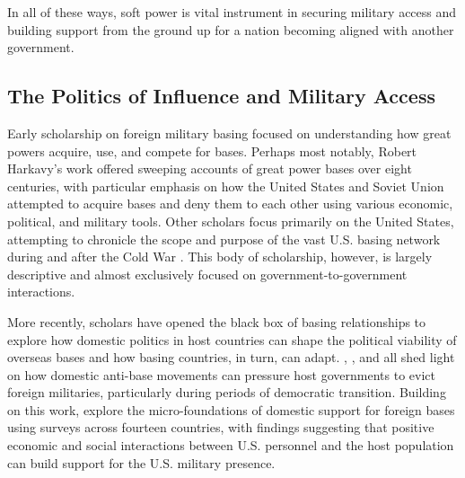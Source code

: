 In all of these ways, soft power is vital instrument in securing military access and building support from the ground up for a nation becoming aligned with another government.


\subsection*{The Politics of Influence and Military Access} 

Early scholarship on foreign military basing focused on understanding how great powers acquire, use, and compete for bases. Perhaps most notably, Robert Harkavy's \citeyear{Harkavy1982,Harkavy1989,Harrison2000} work offered sweeping accounts of great power bases over eight centuries, with particular emphasis on how the United States and Soviet Union attempted to acquire bases and deny them to each other using various economic, political, and military tools. Other scholars focus primarily on the United States, attempting to chronicle the scope and purpose of the vast U.S. basing network during and after the Cold War \cite{vine2015,moore2016,sandars2000}. This body of scholarship, however, is largely descriptive and almost exclusively focused on government-to-government interactions.

More recently, scholars have opened the black box of basing relationships to explore how domestic politics in host countries can shape the political viability of overseas bases and how basing countries, in turn, can adapt. , , and  all shed light on how domestic anti-base movements can pressure host governments to evict foreign militaries, particularly during periods of democratic transition. Building on this work,  explore the micro-foundations of domestic support for foreign bases using surveys across fourteen countries, with findings suggesting that positive economic and social interactions between U.S. personnel and the host population can build support for the U.S. military presence.

